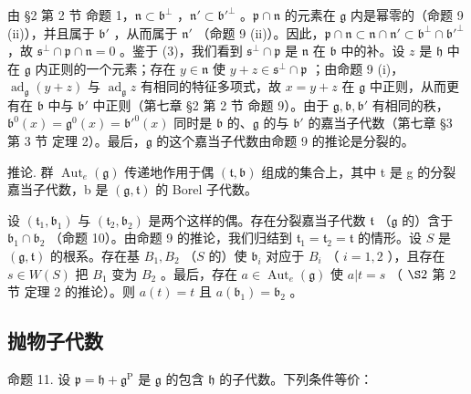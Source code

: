 由 §2 第 2 节 命题 1，\(\mathfrak{n} \subset \mathfrak{b}^{\perp}\) ，\(\mathfrak{n}' \subset \mathfrak{b}'^{\perp}\) 。\(\mathfrak{p} \cap \mathfrak{n}\) 的元素在 \(\mathfrak{g}\) 内是幂零的（命题 9 (ii)），并且属于 \(\mathfrak{b}'\) ，从而属于 \(\mathfrak{n}'\) （命题 9 (ii)）。因此，\(\mathfrak{p} \cap \mathfrak{n} \subset \mathfrak{n} \cap \mathfrak{n}' \subset \mathfrak{b}^{\perp} \cap \mathfrak{b}'^{\perp}\) ，故 \(\mathfrak{s}^{\perp} \cap \mathfrak{p} \cap \mathfrak{n} = 0\) 。鉴于 (3)，我们看到 \(\mathfrak{s}^{\perp} \cap \mathfrak{p}\) 是 \(\mathfrak{n}\) 在 \(\mathfrak{b}\) 中的补。设 \(z\) 是 \(\mathfrak{h}\) 中在 \(\mathfrak{g}\) 内正则的一个元素；存在 \(y \in \mathfrak{n}\) 使 \(y + z \in \mathfrak{s}^{\perp} \cap \mathfrak{p}\) ；由命题 9 (i)，\(\operatorname{ad}_{\mathfrak{g}}(y + z)\) 与 \(\operatorname{ad}_{\mathfrak{g}}z\) 有相同的特征多项式，故 \(x = y + z\) 在 \(\mathfrak{g}\) 中正则，从而更有在 \(\mathfrak{b}\) 中与 \(\mathfrak{b}'\) 中正则（第七章 §2 第 2 节 命题 9）。由于 \(\mathfrak{g}, \mathfrak{b}, \mathfrak{b}'\) 有相同的秩，\(\mathfrak{b}^{0}(x) = \mathfrak{g}^{0}(x) = \mathfrak{b}'^{0}(x)\) 同时是 \(\mathfrak{b}\) 的、\(\mathfrak{g}\) 的与 \(\mathfrak{b}'\) 的嘉当子代数（第七章 §3 第 3 节 定理 2）。最后，\(\mathfrak{g}\) 的这个嘉当子代数由命题 9 的推论是分裂的。

推论. 群 \(\operatorname{Aut}_{e}(\mathfrak{g})\) 传递地作用于偶 \((\mathfrak{t},\mathfrak{b})\) 组成的集合上，其中 t 是 g 的分裂嘉当子代数，b 是 \((\mathfrak{g},\mathfrak{t})\) 的 Borel 子代数。

设 \((\mathfrak{t}_1, \mathfrak{b}_1)\) 与 \((\mathfrak{t}_2, \mathfrak{b}_2)\) 是两个这样的偶。存在分裂嘉当子代数 \(\mathfrak{t}\) （\(\mathfrak{g}\) 的）含于 \(\mathfrak{b}_1 \cap \mathfrak{b}_2\) （命题 10）。由命题 9 的推论，我们归结到 \(\mathfrak{t}_1 = \mathfrak{t}_2 = \mathfrak{t}\) 的情形。设 \(S\) 是 \((\mathfrak{g}, \mathfrak{t})\) 的根系。存在基 \(B_1, B_2\) （\(S\) 的）使 \(\mathfrak{b}_i\) 对应于 \(B_i\) （ \(i = 1, 2\) ），且存在 \(s \in W(S)\) 把 \(B_1\) 变为 \(B_2\) 。最后，存在 \(a \in \operatorname{Aut}_e(\mathfrak{g})\) 使 \(a|t = s\) （ \(\S 2\) 第 2 节 定理 2 的推论）。则 \(a(t) = t\) 且 \(a(\mathfrak{b}_1) = \mathfrak{b}_2\) 。

\subsection{抛物子代数}

命题 11. 设 \(\mathfrak{p} = \mathfrak{h} + \mathfrak{g}^{\mathrm{P}}\) 是 \(\mathfrak{g}\) 的包含 \(\mathfrak{h}\) 的子代数。下列条件等价：

